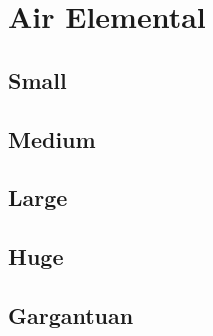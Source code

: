 \section{Air Elemental}

\subsection{Small}

\subsection{Medium}

\subsection{Large}

\subsection{Huge}

\subsection{Gargantuan}